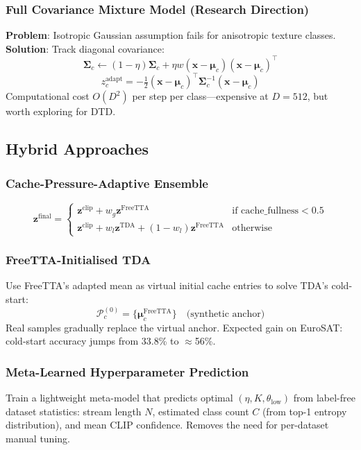 \documentclass[12pt,a4paper]{article}
\newcommand{\bx}{\mathbf{x}}
\newcommand{\bz}{\mathbf{z}}
\newcommand{\bmu}{\boldsymbol{\mu}}
\newcommand{\1}{\mathbf{1}}
\begin{document}
\subsubsection{Full Covariance Mixture Model (Research Direction)}
\textbf{Problem}: Isotropic Gaussian assumption fails for anisotropic texture classes.\\
\textbf{Solution}: Track diagonal covariance:
\begin{equation}
  \boldsymbol{\Sigma}_c \leftarrow (1-\eta)\boldsymbol{\Sigma}_c + \eta w (\bx - \bmu_c)(\bx - \bmu_c)^\top
\end{equation}
\begin{equation}
  z^{\text{adapt}}_c = -\tfrac{1}{2}(\bx - \bmu_c)^\top \boldsymbol{\Sigma}_c^{-1}(\bx - \bmu_c)
\end{equation}
Computational cost $O(D^2)$ per step per class---expensive at $D=512$, but worth exploring for DTD.

\subsection{Hybrid Approaches}

\subsubsection{Cache-Pressure-Adaptive Ensemble}
\begin{equation}
  \bz^{\text{final}} = \begin{cases}
    \bz^{\text{clip}} + w_g \bz^{\text{FreeTTA}} & \text{if cache\_fullness} < 0.5 \\
    \bz^{\text{clip}} + w_l \bz^{\text{TDA}} + (1-w_l)\bz^{\text{FreeTTA}} & \text{otherwise}
  \end{cases}
\end{equation}

\subsubsection{FreeTTA-Initialised TDA}
Use FreeTTA's adapted mean as virtual initial cache entries to solve TDA's cold-start:
\begin{equation}
  \mathcal{P}_c^{(0)} = \{\bmu_c^{\text{FreeTTA}}\} \quad\text{(synthetic anchor)}
\end{equation}
Real samples gradually replace the virtual anchor.
Expected gain on EuroSAT: cold-start accuracy jumps from 33.8\% to $\approx$56\%.

\subsubsection{Meta-Learned Hyperparameter Prediction}
Train a lightweight meta-model that predicts optimal $(\eta, K, \theta_{\text{low}})$ from label-free dataset statistics:
stream length $N$, estimated class count $C$ (from top-1 entropy distribution), and mean CLIP confidence.
Removes the need for per-dataset manual tuning.
\end{document}
